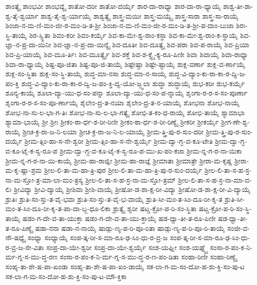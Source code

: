 {ಶಾಂತ್ಯೈ
ಶಾಂಭವೀ
ಶಾಂಭವ್ಯೈ
ಶಾತೋ-ದರೀ
ಶಾತೋ-ದರ್ಯೈ
ಶಾರ-ದಾ-ರಾಧ್ಯಾ
ಶಾರ-ದಾ-ರಾ-ಧ್ಯಾಯೈ
ಶಾಶ್ವ-ತೀ-ಶಾ-ಶ್ವ-ತೈ-ಶ್ವರ್ಯಾ
ಶಾಶ್ವ-ತೈ-ಶ್ವ-ರ್ಯಾಯೈ
ಶಾಶ್ವತ್ಯೈ
ಶಾಸ್ತ್ರ-ಮಯೀ
ಶಾಸ್ತ್ರ-ಮಯ್ಯೈ
ಶಾಸ್ತ್ರ-ಸಾರಾ
ಶಾಸ್ತ್ರ-ಸಾ-ರಾಯೈ
ಶಿಂಜಾ-ನ-ಮ-ಣಿ-ಮಂ-ಜೀ-ರ-ಮಂ-ಡಿ-ತ-ಶ್ರೀ
ಶಿಂಜಾ-ನ-ಮ-ಣಿ-ಮಂ-ಜೀ-ರ-ಮಂ-ಡಿ-ತ-ಶ್ರೀ-ಪ-ದಾಂ-ಬುಜಾ
ಶಿರಃ-ಸ್ಥಿ-ತಾಯೈ
ಶಿರ-ಸ್ಸ್ಥಿತಾ
ಶಿವಂ-ಕರೀ
ಶಿವಂ-ಕರ್ಯೈ
ಶಿವ-ಕಾ-ಮೇ-ಶ್ವ-ರಾಂ-ಕಸ್ಥಾ
ಶಿವ-ಕಾ-ಮೇ-ಶ್ವ-ರಾಂ-ಕ-ಸ್ಥಾಯೈ
ಶಿವ-ಜ್ಞಾ-ನ-ಪ್ರ-ದಾ-ಯಿನೀ
ಶಿವ-ಜ್ಞಾ-ನ-ಪ್ರ-ದಾ-ಯಿನ್ಯೈ
ಶಿವ-ದೂತೀ
ಶಿವ-ದೂತ್ಯೈ
ಶಿವ-ಪರಾ
ಶಿವ-ಪ-ರಾಯೈ
ಶಿವ-ಪ್ರಿಯಾ
ಶಿವ-ಪ್ರಿ-ಯಾಯೈ
ಶಿವ-ಮೂ-ರ್ತಿಃ
ಶಿವ-ಮೂರ್ತ್ಯೈ
ಶಿವ-ಶಕ್ತೆ
ಶಿವ-ಶ-ಕ್ತ್ಯೈ-ಕ್ಯ-ರೂ-ಪಿಣೀ
ಶಿವಾ
ಶಿವಾಯೈ
ಶಿವಾ-ರಾಧ್ಯಾ
ಶಿವಾ-ರಾ-ಧ್ಯಾಯೈ
ಶಿಷ್ಟ-ಪೂ-ಜಿತಾ
ಶಿಷ್ಟ-ಪೂ-ಜಿ-ತಾಯೈ
ಶಿಷ್ಟೇಷ್ಟಾ
ಶಿಷ್ಟೇ-ಷ್ಟಾಯೈ
ಶುಕ್ಲ-ವರ್ಣಾ
ಶುಕ್ಲ-ವ-ರ್ಣಾಯೈ
ಶುಕ್ಲ-ಸಂ-ಸ್ಥಿತಾ
ಶುಕ್ಲ-ಸಂ-ಸ್ಥಿ-ತಾಯೈ
ಶುದ್ಧ-ಮಾ-ನಸಾ
ಶುದ್ಧ-ಮಾ-ನ-ಸಾಯೈ
ಶುದ್ಧ-ವಿ-ದ್ಯಾಂ-ಕು-ರಾ-ಕಾ-ರ-ದ್ವಿ-ಜ-ಪಂ-ಕ್ತಿ
ಶುದ್ಧ-ವಿ-ದ್ಯಾಂ-ಕು-ರಾ-ಕಾ-ರ-ದ್ವಿ-ಜ-ಪಂ-ಕ್ತಿ-ದ್ವ-ಯೋ-ಜ್ಜ್ವಲಾ
ಶುದ್ಧಾ
ಶುದ್ಧಾಯೈ
ಶುಭ-ಕರೀ
ಶುಭ-ಕರ್ಯೈ
ಶೂನ್ಯ-ಕಾಯೈ
ಶೂಲಾ-ದ್ಯಾ-ಯು-ಧ-ಸಂ-ಪನ್ನಾ
ಶೂಲಾ-ದ್ಯಾ-ಯು-ಧ-ಸಂ-ಪ-ನ್ನಾಯೈ
ಶೃಂಗಾ-ರ-ರ-ಸ-ಸಂ-ಪೂರ್ಣಾ
ಶೃಂಗಾ-ರ-ರ-ಸ-ಸಂ-ಪೂ-ರ್ಣಾಯೈ
ಶೈಲೇಂ-ದ್ರ-ತ-ನಯಾ
ಶೈಲೇಂ-ದ್ರ-ತ-ನ-ಯಾಯೈ
ಶೋಭನಾ
ಶೋಭ-ನಾಯೈ
ಶೋಭ-ನಾ-ಸು-ಲ-ಭಾ-ಗ-ತಿಃ
ಶೋಭ-ನಾ-ಸು-ಲ-ಭಾ-ಗತ್ಯೈ
ಶೋಭಿ-ತ-ಕಂ-ಧ-ರಾಯೈ
ಶೋಭಿ-ತಾಯೈ
ಶ್ಯಾಮಾಭಾ
ಶ್ಯಾಮಾ-ಭಾಯೈ
ಶ್ರೀ
ಶ್ರೀಃ
ಶ್ರೀಕಂ-ಠಾ-ರ್ಧ-ಶ-ರೀ-ರಿಣೀ
ಶ್ರೀಕಂ-ಠಾ-ರ್ಧ-ಶ-ರೀ-ರಿಣ್ಯೈ
ಶ್ರೀಕರೀ
ಶ್ರೀಕರ್ಯೈ
ಶ್ರೀಗ-ಣೇ-ಶ್ವ-ರಾಯೈ
ಶ್ರೀಚ-ಕ್ರ-ರಾ-ಜ-ನಿ-ಲಯಾ
ಶ್ರೀಚ-ಕ್ರ-ರಾ-ಜ-ನಿ-ಲ-ಯಾಯೈ
ಶ್ರೀಮ-ತ್ತ್ರಿ-ಪು-ರ-ಸುಂ-ದರೀ
ಶ್ರೀಮ-ತ್ತ್ರಿ-ಪು-ರ-ಸುಂ-ದರ್ಯೈ
ಶ್ರೀಮ-ತ್ಸಿಂ-ಹಾ-ಸ-ನೇ-ಶ್ವರೀ
ಶ್ರೀಮ-ತ್ಸಿಂ-ಹಾ-ಸ-ನೇ-ಶ್ವರ್ಯೈ
ಶ್ರೀಮ-ದ್ವಾ-ಗ್ಭ-ವ-ಕೂ-ಟೇತಿ
ಶ್ರೀಮ-ದ್ವಾ-ಗ್ಭ-ವ-ಕೂ-ಟೈ-ಕ-ಸ್ವ-ರೂ-ಪ
ಶ್ರೀಮ-ದ್ವಾ-ಗ್ಭ-ವ-ಕೂ-ಟೈ-ಕ-ಸ್ವ-ರೂ-ಪ-ಮು-ಖ-ಪಂ-ಕಜಾ
ಶ್ರೀಮ-ನ್ನ-ಗ-ರ-ನಾ-ಯಿಕಾ
ಶ್ರೀಮ-ನ್ನ-ಗ-ರ-ನಾ-ಯಿ-ಕಾಯೈ
ಶ್ರೀಮ-ಹಾ-ರಾಜ್ಞೀ
ಶ್ರೀಮ-ಹಾ-ರಾಜ್ಞೆ
ಶ್ರೀಮಾತಾ
ಶ್ರೀಮಾತ್ರೇ
ಶ್ರೀರಾ-ಮ-ಕೃಷ್ಣ
ಶ್ರೀರಾ-ಮ-ಕೃ-ಷ್ಣಾ-ಶ್ರಮ
ಶ್ರೀಲ-ಲಿ-ತಾ-ಮ-ಹಾ-ತ್ರಿ-ಪುರ
ಶ್ರೀಲ-ಲಿ-ತಾ-ಮ-ಹಾ-ತ್ರಿ-ಪು-ರ-ಸುಂ-ದರ್ಯೈ
ಶ್ರೀಲ-ಲಿ-ತಾ-ಸ-ಹ-ಸ್ರ-ನಾ-ಮ-ಸ್ತೋ-ತ್ರ-ಮಾ-ಲಾ-ಮಂ-ತ್ರಸ್ಯ
ಶ್ರೀಲ-ಲಿ-ತಾ-ಸ-ಹ-ಸ್ರ-ನಾ-ಮ-ಸ್ತೋ-ತ್ರಮ್
ಶ್ರೀಲ-ಲಿ-ತಾ-ಸ-ಹ-ಸ್ರ-ನಾ-ಮಾ-ವ-ಲಿಃ
ಶ್ರೀವಿದ್ಯಾ
ಶ್ರೀವಿ-ದ್ಯಾಯೈ
ಶ್ರೀಶಿವಾ
ಶ್ರೀಶಿ-ವಾಯೈ
ಶ್ರೀಷೋ-ಡ-ಶಾ-ಕ್ಷ-ರೀ-ವಿದ್ಯಾ
ಶ್ರೀಷೋ-ಡ-ಶಾ-ಕ್ಷ-ರೀ-ವಿ-ದ್ಯಾಯೈ
ಶ್ರುತಿಃ
ಶ್ರುತಿ-ಸಂ-ಸ್ತು-ತ-ವೈ-ಭವಾ
ಶ್ರುತಿ-ಸಂ-ಸ್ತು-ತ-ವೈ-ಭ-ವಾಯೈ
ಶ್ರುತಿ-ಸೀ-ಮಂ-ತ-ಸಿಂ-ದೂ-ರೀ-ಕೃ-ತ
ಶ್ರುತಿ-ಸೀ-ಮಂ-ತ-ಸಿಂ-ದೂ-ರೀ-ಕೃ-ತ-ಪಾ-ದಾ-ಬ್ಜ-ಧೂ-ಲಿಕಾ
ಶ್ರುತ್ಯೈ
ಶ್ವರೀ
ಷಟ್ಚ-ಕ್ರೋ-ಪ-ರಿ-ಸಂ-ಸ್ಥಿತಾ
ಷಟ್ಚ-ಕ್ರೋ-ಪ-ರಿ-ಸಂ-ಸ್ಥಿ-ತಾಯೈ
ಷಡಂ-ಗ-ದೇ-ವ-ತಾ-ಯುಕ್ತಾ
ಷಡಂ-ಗ-ದೇ-ವ-ತಾ-ಯು-ಕ್ತಾಯೈ
ಷಡ-ಧ್ವಾ-ತೀ-ತ-ರೂ-ಪಿಣೀ
ಷಡ-ಧ್ವಾ-ತೀ-ತ-ರೂ-ಪಿಣ್ಯೈ
ಷಡಾ-ನನಾ
ಷಡಾ-ನ-ನಾಯೈ
ಷಾಡ್ಗು-ಣ್ಯ-ಪ-ರಿ-ಪೂ-ರಿತಾ
ಷಾಡ್ಗು-ಣ್ಯ-ಪ-ರಿ-ಪೂ-ರಿ-ತಾಯೈ
ಸಂಜೀ-ವ-ನೌ-ಷಧ್ಯೈ
ಸಂಧ್ಯಾ
ಸಂಧ್ಯಾಯೈ
ಸಂಪ-ತ್ಕ-ರೀ-ಸ-ಮಾ-ರೂ-ಢ-ಸಿಂ-ಧು-ರ-ವ್ರ-ಜ
ಸಂಪ-ತ್ಕ-ರೀ-ಸ-ಮಾ-ರೂ-ಢ-ಸಿಂ-ಧು-ರ-ವ್ರ-ಜ-ಸೇ-ವಿತಾ
ಸಂಪ್ರ-ದಾ-ಯೇ-ಶ್ವರೀ
ಸಂಪ್ರ-ದಾ-ಯೇ-ಶ್ವರ್ಯೈ
ಸಂಶ-ಯಘ್ನೀ
ಸಂಶ-ಯಘ್ನ್ಯೈ
ಸಂಸಾ-ರ-ಪಂ-ಕ-ನಿ-ರ್ಮ-ಗ್ನ-ಸ-ಮು-ದ್ಧ-ರಣ
ಸಂಸಾ-ರ-ಪಂ-ಕ-ನಿ-ರ್ಮ-ಗ್ನ-ಸ-ಮು-ದ್ಧ-ರ-ಣ-ಪಂ-ಡಿತಾ
ಸಂಹಾ-ರಿಣೀ
ಸಂಹಾ-ರಿಣ್ಯೈ
ಸಂಹೃ-ತಾ-ಶೇ-ಷ-ಪಾ-ಖಂಡಾ
ಸಂಹೃ-ತಾ-ಶೇ-ಷ-ಪಾ-ಖಂ-ಡಾಯೈ
ಸಕ-ಲಾ-ಗ-ಮ-ಸಂ-ದೋ-ಹ-ಶು-ಕ್ತಿ-ಸಂ-ಪು-ಟ
ಸಕ-ಲಾ-ಗ-ಮ-ಸಂ-ದೋ-ಹ-ಶು-ಕ್ತಿ-ಸಂ-ಪು-ಟ-ಮೌ-ಕ್ತಿಕಾ
}
